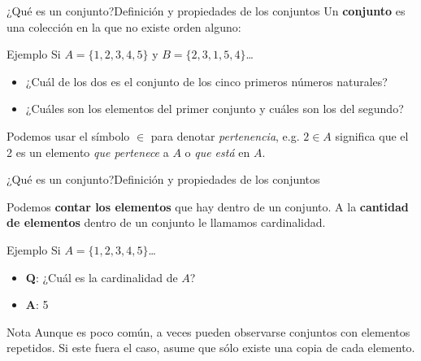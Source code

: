 \documentclass[spanish, c]{beamer}
\begin{document}
\begin{frame}{¿Qué es un conjunto?}{Definición y propiedades de los conjuntos}
    Un \textbf{conjunto} es una colección en la que \alert{no existe orden alguno}:
    \bigskip
    \begin{exampleblock}{Ejemplo}
        Si $A = \{1, 2, 3, 4, 5\}$ y $B = \{2, 3, 1, 5, 4\}$\dots

        \begin{itemize}
            \item ¿Cuál de los dos es el conjunto de los cinco primeros números naturales?
            \item ¿Cuáles son los elementos del primer conjunto y cuáles son los del segundo?
        \end{itemize}
    \end{exampleblock}

    Podemos usar el símbolo $\in$ para denotar \textit{pertenencia}, e.g. $2 \in A$ significa que el 2 es un elemento \textit{que pertenece} a $A$ o \textit{que está} en $A$.
\end{frame}

\begin{frame}{¿Qué es un conjunto?}{Definición y propiedades de los conjuntos}
    
    Podemos \textbf{contar los elementos} que hay dentro de un conjunto.
    A la \textbf{cantidad de elementos} dentro de un conjunto le llamamos \alert{cardinalidad}. \pause

    \bigskip

    \begin{exampleblock}{Ejemplo}
        Si $A = \{1, 2, 3, 4, 5\}$\dots

        \begin{itemize}
            \item \textbf{Q}: ¿Cuál es la cardinalidad de $A$?
            \item \textbf{A}: 5
        \end{itemize}
    \end{exampleblock} \pause

    \begin{block}{Nota}
        Aunque es poco común, a veces pueden observarse conjuntos con elementos repetidos.
        Si este fuera el caso, asume que sólo existe una copia de cada elemento.
    \end{block}

\end{frame}
\end{document}
